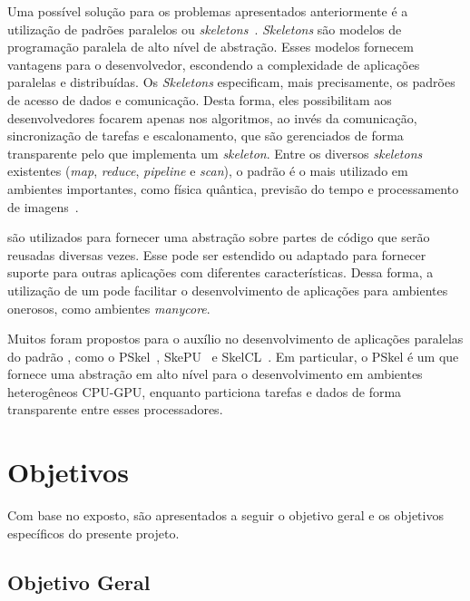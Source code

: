 Uma possível solução para os problemas apresentados anteriormente é a utilização de padrões
paralelos ou \textit{skeletons}~\cite{cole-skeleton:2004}. \textit{Skeletons}
são modelos de programação paralela de alto nível de abstração. Esses modelos fornecem
vantagens para o desenvolvedor, escondendo a complexidade de aplicações
paralelas e distribuídas. Os \textit{Skeletons} especificam, mais precisamente,
os padrões de acesso de dados e comunicação. Desta forma, eles possibilitam aos
desenvolvedores focarem apenas nos algoritmos, ao invés da comunicação,
sincronização de tarefas e escalonamento, que são gerenciados de forma
transparente pelo \fw que implementa um \textit{skeleton}.
Entre os diversos \textit{skeletons} existentes (\textit{map}, \textit{reduce},
\textit{pipeline} e \textit{scan}), o padrão \stencil é o mais
utilizado em ambientes importantes, como física quântica, previsão do tempo e
processamento de imagens~\cite{gonzalez06,holewinski12}.


\Fws são utilizados para fornecer uma abstração sobre partes de código que serão
reusadas diversas vezes. Esse \fw pode ser estendido ou adaptado para fornecer
suporte para outras aplicações com diferentes características. Dessa forma, a
utilização de um \fw pode facilitar o desenvolvimento de aplicações para
ambientes onerosos, como ambientes \textit{manycore}.

Muitos \fws foram propostos para o auxílio no desenvolvimento de aplicações paralelas do
padrão \stencil, como o
PSkel~\cite{pereira15}, SkePU~\cite{enmyren10} e SkelCL~\cite{steuwer11}. Em
particular, o PSkel é um \fw que fornece uma abstração em alto nível para o
desenvolvimento em ambientes heterogêneos CPU-GPU, enquanto particiona tarefas e
dados de forma transparente entre esses processadores.

\section{Objetivos}

Com base no exposto, são apresentados a seguir o objetivo geral e os objetivos específicos
do presente projeto.

\subsection{Objetivo Geral}

